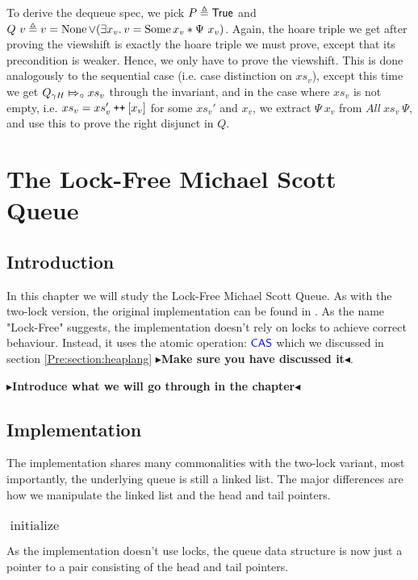 \documentclass[a4paper, 11pt]{report}
\newcommand{\initialise}{\operatorname{initialize}}
\newcommand\catenate{\mathbin{\text{\ttfamily\upshape ++}}}
\newcommand{\abstractstatefullfrag}[2]{#1 \Mapsto_{\circ} #2}
\newcommand{\todo}[1]{{\color[rgb]{.5,0,0}\textbf{$\blacktriangleright$#1$\blacktriangleleft$}}}
\begin{document}
To derive the dequeue spec, we pick $P \triangleq \textsf{True}$ and $Q \ v \eqdef v = \None \lor (\Exists x_v . v = \Some{x_v} \star \Psi \ x_v)$. Again, the hoare triple we get after proving the viewshift is exactly the hoare triple we must prove, except that its precondition is weaker. Hence, we only have to prove the viewshift. This is done analogously to the sequential case (i.e. case distinction on $xs_v$), except this time we get $\abstractstatefullfrag{Q_{\gname H}}{xs_v}$ through the invariant, and in the case where $xs_v$ is not empty, i.e. $xs_v = xs_v' \catenate [x_v]$ for some $xs_v'$ and $x_v$, we extract $\Psi \ x_v$ from $All\ xs_v \ \Psi$, and use this to prove the right disjunct in $Q$.


\chapter{The Lock-Free Michael Scott Queue}
\label{ch:LFMSQ}

\section{Introduction}
\label{LFMSQ:section:introduction}

In this chapter we will study the Lock-Free Michael Scott Queue. As with the two-lock version, the original implementation can be found in \cite{DBLP:conf/podc/MichaelS96}. As the name "Lock-Free" suggests, the implementation doesn't rely on locks to achieve correct behaviour. Instead, it uses the atomic operation: $\textsf{\color{blue} CAS}$ which we discussed in section \ref{Pre:section:heaplang} \todo{Make sure you have discussed it}.

\todo{Introduce what we will go through in the chapter}

\section{Implementation}
\label{LFMSQ:section:implementation}

The implementation shares many commonalities with the two-lock variant, most importantly, the underlying queue is still a linked list. The major differences are how we manipulate the linked list and the head and tail pointers.

\subsection[Initialise]{$\initialise$}
As the implementation doesn't use locks, the queue data structure is now just a pointer to a pair consisting of the head and tail pointers.
\end{document}
